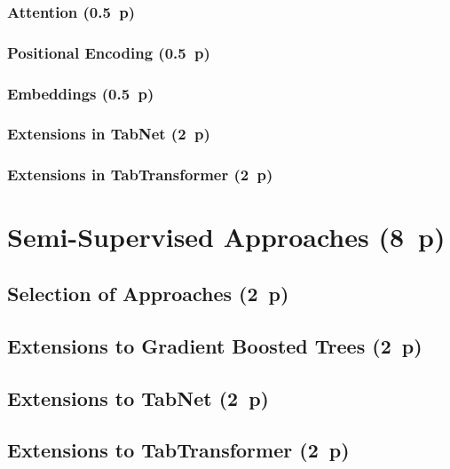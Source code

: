 \subsubsection{Attention (0.5~p)}\label{attention}

\subsubsection{Positional Encoding (0.5~p)}\label{positional-encoding}

\subsubsection{Embeddings (0.5~p)}\label{embeddings}

\subsubsection{Extensions in TabNet (2~p)}\label{extensions-in-tabnet}

\subsubsection{Extensions in
  TabTransformer (2~p)}\label{extensions-in-tabtransformer}

\newpage
\section{Semi-Supervised Approaches (8~p)}\label{semi-supervised-approaches}

\subsection{Selection of Approaches (2~p)}\label{selection-of-approaches-1}

\subsection{Extensions to Gradient Boosted
  Trees (2~p)}\label{extensions-to-gradient-boosted-trees}

\subsection{Extensions to TabNet (2~p)}\label{extensions-to-tabnet}

\subsection{Extensions to
  TabTransformer (2~p)}\label{extensions-to-tabtransformer}

